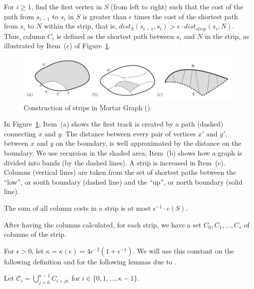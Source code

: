 For \(i \geq 1\), find the first vertex in \(S\) (from left to right) such that the cost of the path from \(s_{i-1}\) to \(s_i\) in \(S\) is greater than \(\epsilon\) times the cost of the shortest path from \(s_i\) to \(N\) within the strip, that is, \(dist_S(s_{i-1}, s_i) > \epsilon \cdot dist_{strip}(s_i, N)\). Thus, column \(C_i\) is defined as the shortest path between \(s_i\) and \(N\) in the strip, as illustrated by Item~(c) of Figure~\ref{fig:mortar2}.

\begin{figure}[H]
    \centering
    \includegraphics[scale=0.5]{imgs/mortar2.png}
    \caption{Construction of strips in Mortar Graph (\cite{Borradaile2009b}).}
    \label{fig:mortar2}
\end{figure}

In Figure~\ref{fig:mortar2}, Item~(a) shows the first track is created by a path (dashed) connecting \(x\) and \(y\). The distance between every pair of vertices \(x'\) and \(y'\), between \(x\) and \(y\) on the boundary, is well approximated by the distance on the boundary. We use recursion in the shaded area; Item~(b) shows how a graph is divided into bands (by the dashed lines). A strip is increased in Item~(c). Columns (vertical lines) are taken from the set of shortest paths between the ``low'', or south boundary (dashed line) and the ``up'', or north boundary (solid line).

\begin{flemma}
The sum of all column costs in a strip is at most \(\epsilon^{-1} \cdot c(S)\).
\end{flemma}

After having the columns calculated, for each strip, we have a set \(C_0, C_1, \dots, C_s\) of columns of the strip.

For \(\epsilon > 0\), let \(\kappa = \kappa(\epsilon) = 4 \epsilon ^ {-2} (1 + \epsilon ^ {-1})\). We will use this constant on the following definition and for the following lemmas due to \cite{Borradaile2009b}.

Let \(\mathcal{C}_i = \bigcup_{j=0}^{\kappa-1} C_{i+j\kappa}\) for \(i \in \{0, 1, \dots, \kappa - 1\}\).

